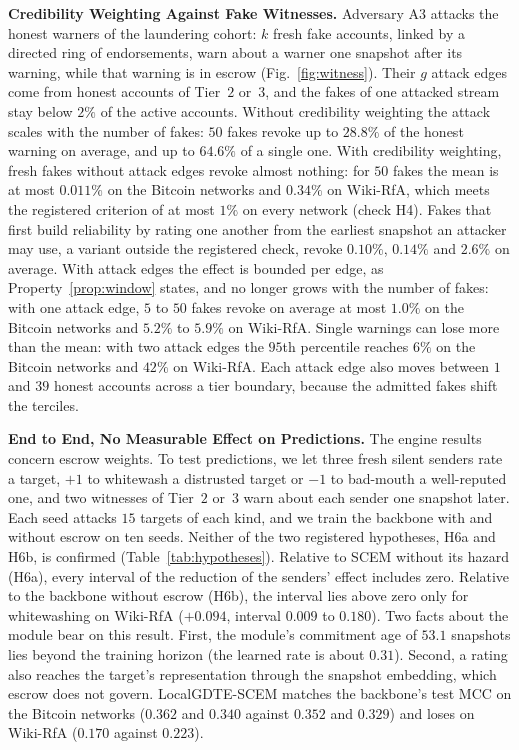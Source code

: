 \documentclass[lettersize,journal]{IEEEtran}
\begin{document}
\smallskip\noindent\textbf{Credibility Weighting Against Fake Witnesses.}
Adversary A3 attacks the honest warners of the laundering cohort: $k$ fresh fake accounts, linked by a directed ring of endorsements, warn about a warner one snapshot after its warning, while that warning is in escrow (Fig.~\ref{fig:witness}).
Their $g$ attack edges come from honest accounts of Tier~$2$ or~$3$, and the fakes of one attacked stream stay below $2\%$ of the active accounts.
Without credibility weighting the attack scales with the number of fakes: $50$ fakes revoke up to $28.8\%$ of the honest warning on average, and up to $64.6\%$ of a single one.
With credibility weighting, fresh fakes without attack edges revoke almost nothing: for $50$ fakes the mean is at most $0.011\%$ on the Bitcoin networks and $0.34\%$ on Wiki-RfA, which meets the registered criterion of at most $1\%$ on every network (check H4).
Fakes that first build reliability by rating one another from the earliest snapshot an attacker may use, a variant outside the registered check, revoke $0.10\%$, $0.14\%$ and $2.6\%$ on average.
With attack edges the effect is bounded per edge, as Property~\ref{prop:window} states, and no longer grows with the number of fakes: with one attack edge, $5$ to $50$ fakes revoke on average at most $1.0\%$ on the Bitcoin networks and $5.2\%$ to $5.9\%$ on Wiki-RfA.
Single warnings can lose more than the mean: with two attack edges the $95$th percentile reaches $6\%$ on the Bitcoin networks and $42\%$ on Wiki-RfA.
Each attack edge also moves between $1$ and $39$ honest accounts across a tier boundary, because the admitted fakes shift the terciles.

\smallskip\noindent\textbf{End to End, No Measurable Effect on Predictions.}
The engine results concern escrow weights.
To test predictions, we let three fresh silent senders rate a target, $+1$ to whitewash a distrusted target or $-1$ to bad-mouth a well-reputed one, and two witnesses of Tier~$2$ or~$3$ warn about each sender one snapshot later.
Each seed attacks $15$ targets of each kind, and we train the backbone with and without escrow on ten seeds.
Neither of the two registered hypotheses, H6a and H6b, is confirmed (Table~\ref{tab:hypotheses}).
Relative to SCEM without its hazard (H6a), every interval of the reduction of the senders' effect includes zero.
Relative to the backbone without escrow (H6b), the interval lies above zero only for whitewashing on Wiki-RfA ($+0.094$, interval $0.009$ to $0.180$).
Two facts about the module bear on this result.
First, the module's commitment age of $53.1$ snapshots lies beyond the training horizon (the learned rate is about $0.31$). Second, a rating also reaches the target's representation through the snapshot embedding, which escrow does not govern.
LocalGDTE-SCEM matches the backbone's test MCC on the Bitcoin networks ($0.362$ and $0.340$ against $0.352$ and $0.329$) and loses on Wiki-RfA ($0.170$ against $0.223$).
\end{document}
